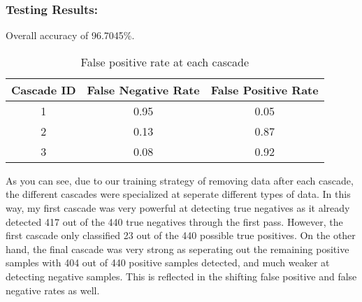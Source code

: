 \documentclass{article}
\begin{document}
\subsubsection{Testing Results: }
Overall accuracy of 96.7045\%.
\begin{table}[H]
    \centering
    \begin{tabular}{|c|c|c|}
        \hline
        \textbf{Cascade ID} & \textbf{False Negative Rate} & \textbf{False Positive Rate} \\ \hline
            1 & 0.95 & 0.05 \\ \hline
            2 & 0.13 & 0.87 \\ \hline
            3 & 0.08 & 0.92 \\ \hline
    \end{tabular}
    \caption{False positive rate at each cascade}
\end{table}
As you can see, due to our training strategy of removing data after each cascade, the different cascades were specialized at seperate different types of data. In this way, my first cascade was very powerful at detecting true negatives as it already detected 417 out of the 440 true negatives through the first pass. However, the first cascade only classified 23 out of the 440 possible true positives. On the other hand, the final cascade was very strong as seperating out the remaining positive samples with 404 out of 440 positive samples detected, and much weaker at detecting negative samples. This is reflected in the shifting false positive and false negative rates as well.
\end{document}
